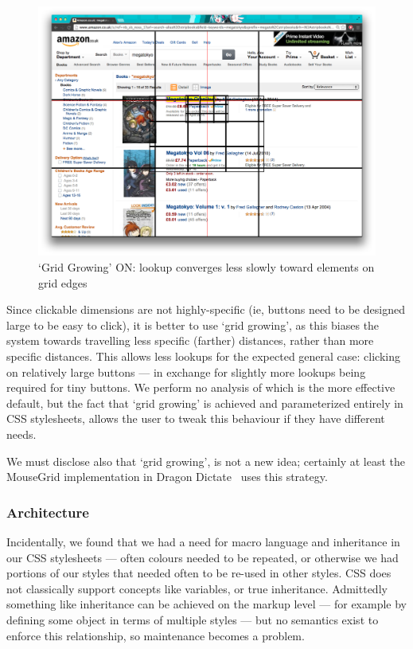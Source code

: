 \documentclass[11pt,openright,a4paper]{report}
\begin{document}
\begin{figure}[ht]
\centering\includegraphics[width=\textwidth]{figures/GrowingOn.png}
\caption{`Grid Growing' ON: lookup converges less slowly toward elements on grid edges}
\label{fig:growingon}
\end{figure}

\FloatBarrier
Since clickable dimensions are not highly-specific (ie, buttons need to be designed large to be easy to click), it is better to use `grid growing', as this biases the system towards travelling less specific (farther) distances, rather than more specific distances. This allows less lookups for the expected general case: clicking on relatively large buttons --- in exchange for slightly more lookups being required for tiny buttons. We perform no analysis of which is the more effective default, but the fact that `grid growing' is achieved and parameterized entirely in CSS stylesheets, allows the user to tweak this behaviour if they have different needs.

We must disclose also that `grid growing', is not a new idea; certainly at least the MouseGrid implementation in Dragon Dictate~\cite{nuancegrid} uses this strategy.

\subsubsection{Architecture}
Incidentally, we found that we had a need for macro language and inheritance in our CSS stylesheets --- often colours needed to be repeated, or otherwise we had portions of our styles that needed often to be re-used in other styles. CSS does not classically support concepts like variables, or true inheritance. Admittedly something like inheritance can be achieved on the markup level --- for example by defining some object in terms of multiple styles --- but no semantics exist to enforce this relationship, so maintenance becomes a problem.
\end{document}
